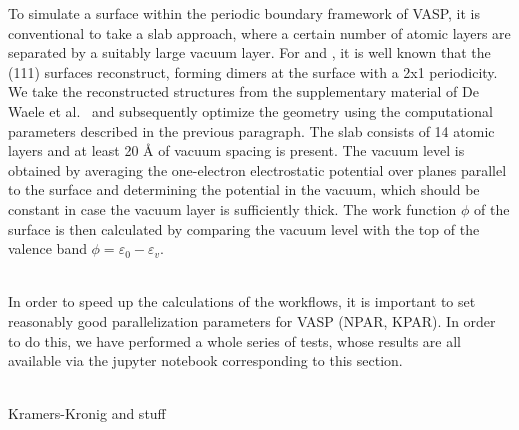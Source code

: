 \begin{refsection}
To simulate a surface within the periodic boundary framework of VASP, it is 
conventional to take a slab approach, where a certain number of atomic layers 
are separated by a suitably large vacuum layer. For  and , it is 
well known that the (111) surfaces reconstruct, forming dimers at the surface 
with a 2x1 periodicity. We take the reconstructed structures from the 
supplementary material of De Waele et al.~\cite{DeWaele2016} and subsequently 
optimize the geometry using the computational parameters described in the 
previous paragraph. The slab consists of 14 atomic layers and at least 20 
\si{\angstrom} of vacuum spacing is present. The vacuum level is obtained by 
averaging the one-electron electrostatic potential over planes parallel to the 
surface and determining the potential in the vacuum, which should be constant 
in case the vacuum layer is sufficiently thick. The work function $\phi$ of 
the surface is then calculated by comparing the vacuum level with the top of 
the valence band $\phi = \varepsilon_0 - \varepsilon_v$. 


\label{appendix:sec-parallel}\\ 
In order to speed up the calculations of the workflows, it is important to set 
reasonably good parallelization parameters for VASP (NPAR, KPAR). In order to 
do this, we have performed a whole series of tests, whose results are all 
available via the jupyter notebook corresponding to this section. 
 
 
\label{appendix:sec-cshift}\\ 
Kramers-Kronig and stuff 
 
\printbibliography 
\end{refsection} 